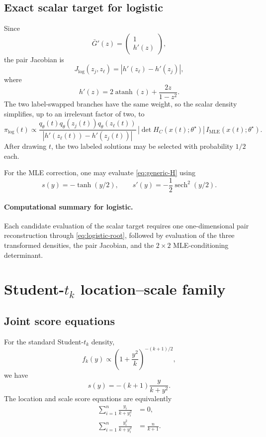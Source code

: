 \documentclass[11pt]{article}
\newcommand{\1}{\mathbf{1}}
\newcommand{\atanh}{\operatorname{atanh}}
\newcommand{\sech}{\operatorname{sech}}
\newcommand{\MLE}{\mathrm{MLE}}
\begin{document}
\subsection{Exact scalar target for logistic}

Since
\[
    \bar G'(z)
    =
    \begin{pmatrix}
        1\\h'(z)
    \end{pmatrix},
\]
the pair Jacobian is
\begin{equation}
\boxed{
    J_{\mathrm{log}}(z_j,z_\ell)
    =|h'(z_\ell)-h'(z_j)|,
}
\end{equation}
where
\[
    h'(z)
    =2\atanh(z)+\frac{2z}{1-z^2}.
\]
The two label-swapped branches have the same weight, so the scalar density simplifies, up to an irrelevant factor of two, to
\begin{equation}
\boxed{
\pi_{\mathrm{log}}(t)
\propto
\frac{
q_\theta(t)
q_\theta(z_j(t))
q_\theta(z_\ell(t))
}{|h'(z_\ell(t))-h'(z_j(t))|}
\,|\det H_C(x(t);\theta^\star)|
\,I_{\MLE}(x(t);\theta^\star).
}
\label{eq:logistic-scalar-target}
\end{equation}
After drawing $t$, the two labeled solutions may be selected with probability $1/2$ each.

For the MLE correction, one may evaluate \eqref{eq:generic-H} using
\[
    s(y)=-\tanh(y/2),
    \qquad
    s'(y)=-\frac12\sech^2(y/2).
\]

\paragraph{Computational summary for logistic.}
Each candidate evaluation of the scalar target requires one one-dimensional pair reconstruction through \eqref{eq:logistic-root}, followed by evaluation of the three transformed densities, the pair Jacobian, and the $2\times2$ MLE-conditioning determinant.

\section{Student-$t_k$ location--scale family}

\subsection{Joint score equations}

For the standard Student-$t_k$ density,
\[
    f_k(y)
    \propto
    \left(1+\frac{y^2}{k}\right)^{-(k+1)/2},
\]
we have
\[
    s(y)=-(k+1)\frac{y}{k+y^2}.
\]
The location and scale score equations are equivalently
\begin{align}
    \sum_{i=1}^n \frac{y_i}{k+y_i^2}&=0,
    \label{eq:student-loc-score}\\
    \sum_{i=1}^n \frac{y_i^2}{k+y_i^2}&=\frac{n}{k+1}.
    \label{eq:student-scale-score}
\end{align}
\end{document}
